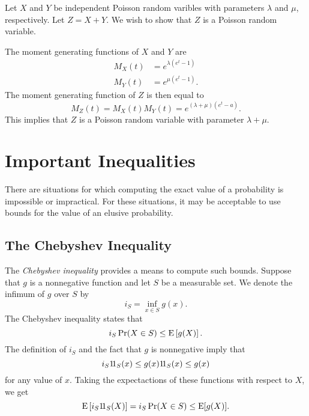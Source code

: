 \begin{example}
Let $X$ and $Y$ be independent Poisson random varibles with parameters $\lambda$ and $\mu$, respectively.
Let $Z = X + Y$.
We wish to show that $Z$ is a Poisson random variable.

The moment generating functions of $X$ and $Y$ are
\begin{align*}
M_X (t) &= e^{\lambda ( e^t -1)} \\
M_Y (t) &= e^{\mu ( e^t -1)} .
\end{align*}
The moment generating function of $Z$ is then equal to
\begin{equation*}
M_Z (t) = M_X (t) M_Y (t) = e^{(\lambda + \mu) (e^t - a)} .
\end{equation*}
This implies that $Z$ is a Poisson random variable with parameter $\lambda + \mu$.
\end{example}


\section{Important Inequalities}

There are situations for which computing the exact value of a probability is impossible or impractical.
For these situations, it may be acceptable to use bounds for the value of an elusive probability.


\subsection{The Chebyshev Inequality}

The \emph{Chebyshev inequality} provides a means to compute such bounds.
Suppose that $g$ is a nonnegative function and let $S$ be a measurable set.
We denote the infimum of $g$ over $S$ by
\begin{equation*}
i_S = \inf_{ x \in S } g (x) .
\end{equation*}
The Chebyshev inequality states that
\begin{equation*}
i_S \Pr (X \in S)
\leq \mathrm{E} \left[ g(X) \right] .
\end{equation*}
The definition of $i_S$ and the fact that $g$ is nonnegative imply that
\begin{equation*}
i_S \mathrm{1\!1}_S (x) \leq g(x) \mathrm{1\!1}_S (x) \leq g(x)
\end{equation*}
for any value of $x$.
Taking the expectactions of these functions with respect to $X$, we get
\begin{equation*}
\mathrm{E} \left[ i_S \mathrm{1\!1}_S (X) \right]
= i_S \Pr (X \in S) \leq \mathrm{E} [g (X)] .
\end{equation*}


